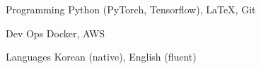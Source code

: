 

\begin{cvskills}

  \cvskill
    {Programming} %
    {Python (PyTorch, Tensorflow), LaTeX, Git} %

  \cvskill
    {Dev Ops}%
    {Docker, AWS} %

  \cvskill
    {Languages} %
    {Korean (native), English (fluent)} %



\end{cvskills}
